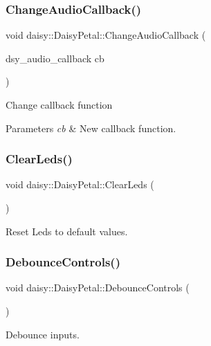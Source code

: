 \begin{DoxyCompactItemize}
\subsubsection{\texorpdfstring{Change\+Audio\+Callback()}{ChangeAudioCallback()}}
{\footnotesize\ttfamily void daisy\+::\+Daisy\+Petal\+::\+Change\+Audio\+Callback (\begin{DoxyParamCaption}\item[{dsy\+\_\+audio\+\_\+callback}]{cb }\end{DoxyParamCaption})}

Change callback function 
\begin{DoxyParams}{Parameters}
{\em cb} & New callback function. \\
\hline
\end{DoxyParams}
\mbox{\label{classdaisy_1_1_daisy_petal_a8588251c1467e19448ee5c6d9cd8d721}} 
\subsubsection{\texorpdfstring{Clear\+Leds()}{ClearLeds()}}
{\footnotesize\ttfamily void daisy\+::\+Daisy\+Petal\+::\+Clear\+Leds (\begin{DoxyParamCaption}{ }\end{DoxyParamCaption})}

Reset Leds to default values. \mbox{\label{classdaisy_1_1_daisy_petal_abb215401101f03ccfbc07736b11c5dbc}} 
\subsubsection{\texorpdfstring{Debounce\+Controls()}{DebounceControls()}}
{\footnotesize\ttfamily void daisy\+::\+Daisy\+Petal\+::\+Debounce\+Controls (\begin{DoxyParamCaption}{ }\end{DoxyParamCaption})}

Debounce inputs. \mbox{\label{classdaisy_1_1_daisy_petal_a927afd75574f8fdd509e23a38c176ed9}} 

\end{DoxyCompactItemize}
